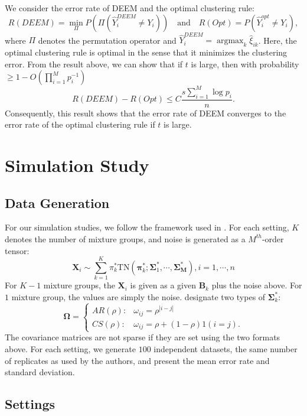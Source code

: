 \documentclass[11pt]{article}
\newcommand{\amax}{\operatorname*{argmax}}
\newcommand{\wh}{\widehat}
\begin{document}
We consider the error rate of DEEM and the optimal clustering rule:
$$
R(DEEM)= \min_{\Pi} P(\Pi(\wh Y_i^{DEEM} \neq Y_i)) \quad\text{and}\quad R(Opt)= P(\wh Y_i^{opt} \neq Y_i),
$$
where $\Pi$ denotes the permutation operator and $\wh Y_i^{DEEM}= \amax_k \wh\xi_{ik}$.
Here, the optimal clustering rule is optimal in the sense that it minimizes the clustering error.
From the result above, we can show that if $t$ is large, then with probability $\ge 1- O(\prod_{i=1}^M p_i^{-1})$
$$
R(DEEM) - R(Opt) \le C \frac{s\sum_{i=1}^M \log p_i}{n}.
$$
Consequently, this result shows that the error rate of DEEM converges to the error rate of the optimal clustering rule if $t$ is large.


\section{Simulation Study}

\subsection{Data Generation}

For our simulation studies, we follow the framework used in \cite{mai2022DEEM}. For each setting, $K$ denotes the number of mixture groups, and noise is generated as a $M^{th}$-order tensor:  
\begin{equation}
    \mathbf{X}_i \sim \sum_{k=1}^K \pi^*_k \mbox{TN} (\boldsymbol{\pi}^*_k; \boldsymbol{\Sigma}^*_1, \cdots, \boldsymbol{\Sigma^*_M}), i = 1, \cdots, n
\end{equation}
For $K-1$ mixture groups, the $\mathbf{X}_i$ is given as a given $\mathbf{B}_k$ plus the noise above. For $1$ mixture group, the values are simply the noise. \citeauthor{mai2022DEEM} designate two types of $\boldsymbol{\Sigma}^*_k$: 
\begin{equation*}
    \boldsymbol{\Omega} =  
    \left\{
    \begin{aligned}
     AR(\rho): & \omega_{ij} = \rho^{|i-j|} \\
    CS(\rho): & \omega_{ij} = \rho + (1-\rho) 1(i=j).   
    \end{aligned}
    \right.
\end{equation*}
The covariance matrices are not sparse if they are set using the two formats above. For each setting, we generate $100$ independent datasets, the same number of replicates as used by the authors, and present the mean error rate and standard deviation. 

\subsection{Settings}
\end{document}
